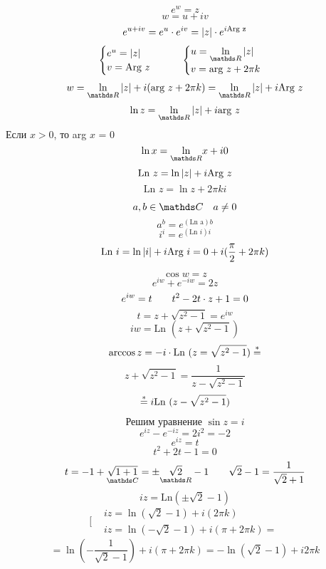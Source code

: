 \documentclass[main]{subfiles}
\begin{document}
\begin{lect}
  	\begin{Definition} 
  	    \[e^w = z\]
    		\[w = u + iv\]
    		\[e^{u + iv} = e^u \cdot e^{iv} = \left|z\right| \cdot e^{i \text{Arg z}} \]
    		\[\begin{cases}
    				e^u = \abs{z}\\
    				v = \text{Arg } z
    		\end{cases} \qq \begin{cases}
    				u = \us{\R}{\ln} \abs{z}\\
    				v = \text{arg } z + 2 \pi k
    		\end{cases}\]
    		\[w = \us{\R}{\ln} \abs{z} + i (\text{arg } z + 2\pi k) = \us{\R}{\ln } \abs{z} + i \text{Arg } z\]
    		\[\ln z = \us{\R}{\ln}\abs{z} + i \text{arg } z\]
    		Если $x > 0$, то arg $x$ = 0
    		\[\ln x = \us{\R}{\ln} x + i0\]
    		\[\text{Ln } z = \ln \left|z\right| + i \text{Arg } z\]
    		\[\text{Ln } z = \ln z + 2 \pi k i\]

    		\[a, b \in \CC \q a \neq 0\]
    		\[a^b = e ^ {(\text{Ln a})b}\]
    		\[i^i = e^{(\text{Ln } i)i} \]
    		\[\text{Ln } i = \ln \left|i\right| + i \text{Arg } i = 0 + i (\frac{\pi}{2} + 2 \pi k)\]
  	\end{Definition}

  	\begin{Definition} 
  	    \[\cos w = z\]
    		\[e^{iw} + e^{-iw} = 2z\]
    		\[e^{iw} = t \qquad t^2 - 2t \cdot z + 1 = 0\]
    		\[t = z + \sqrt{z^2 - 1} = e^{iw} \]
    		\[iw = \text{Ln } (z + \sqrt{z^2 - 1})\]
    		\[\arccos z = -i \cdot\text{Ln } (z = \sqrt{z^2 - 1})  \overset{*}{=}\]
    		\[z + \sqrt{z^2 - 1} = \frac{1}{z - \sqrt{z^2  - 1}}\]
    		\[\overset{*}{=} i \text{Ln } (z - \sqrt{z^2 - 1})\]
  	\end{Definition}

  	\begin{Example}
    		\[\text{Решим уравнение } \sin z = i\]
    		\[e^{iz} - e^{-iz} = 2i^2 = -2  \]
    		\[e^{iz}  = t\]
    		\[t^2 + 2t - 1 = 0\]
    		\[t = -1 + \us{\CC}{\sqrt{1 + 1}} = \pm \us{\R}{\sqrt{2}} - 1 \qq \sqrt{2} - 1 = \frac{1}{\sqrt{2} + 1}\]
    		\[iz = \text{Ln} (\pm \sqrt{2} - 1)\]
    		\[\bigg[\begin{align}
    				&iz = \ln(\sqrt{2} - 1) + i (2 \pi k)\\
    				&iz = \ln(-\sqrt{2} - 1) + i (\pi + 2 \pi k) =
    		\end{align}\]
    		\[ = \ln(- \frac{1}{\sqrt{2} - 1}) + i (\pi + 2\pi k) = -\ln(\sqrt{2} - 1) + i 2 \pi k\]
  	\end{Example}


\end{lect}
\end{document}
